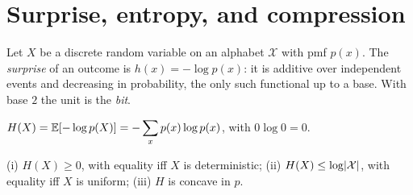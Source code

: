 \documentclass[11pt]{article}
\begin{document}

\begin{abstract}
\noindent We develop Shannon's information theory from the ground up: surprise and entropy, the
asymptotic equipartition property and the source-coding bound, the convexity inequalities (Jensen,
log-sum, Gibbs), joint and conditional entropy, relative entropy, and mutual information with all
its identities. We then go beyond pairwise information to the \emph{multivariate} theory ---
interaction information, total correlation, and the partial information decomposition of a
multi-source channel into \emph{redundant}, \emph{unique}, and \emph{synergistic} components. We
treat continuous variables (differential entropy, maximum-entropy distributions, the Gaussian
channel and water-filling), the data-processing and Fano inequalities, and close with a detailed
application to neural coding: the noise/response decomposition, the direct method and its
finite-sample bias, the Fisher-information lower bound, and synergy and redundancy in neural
populations.
\end{abstract}

\tableofcontents
\vspace{1em}

\section{Surprise, entropy, and compression}

Let $X$ be a discrete random variable on an alphabet $\mathcal X$ with pmf $p(x)$. The
\emph{surprise} of an outcome is $h(x)=-\log p(x)$: it is additive over independent events and
decreasing in probability, the only such functional up to a base. With base $2$ the unit is the
\emph{bit}.

\begin{definition}[Entropy]
$\displaystyle H(X)=\mathbb{E}[-\log p(X)]=-\sum_{x}p(x)\log p(x)$, with $0\log0=0$.
\end{definition}

\begin{proposition}\label{prop:H}
(i) $H(X)\ge0$, with equality iff $X$ is deterministic; (ii) $H(X)\le\log\lvert\mathcal X\rvert$, with
equality iff $X$ is uniform; (iii) $H$ is concave in $p$.
\end{proposition}
\end{document}
